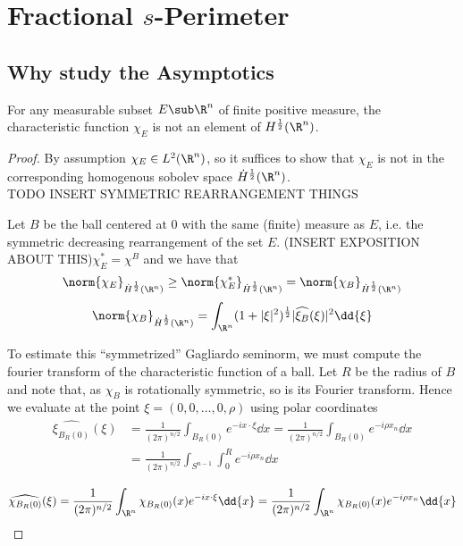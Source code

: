 \documentclass[../main.tex]{subfiles}
\begin{document}
\section{Fractional $s$-Perimeter}

\subsection{Why study the Asymptotics}

\begin{fact}
    For any measurable subset $ E\sub \R^{n} $ of finite positive measure, the characteristic function $ \chi_{E} $ is not an element of $ H^{\frac{1}{2}}(\R^{n}) $.
\end{fact}

\begin{proof}
    By assumption $ \chi_{E}\in L^{2}(\R^{n})$, so it suffices to show that $ \chi_{E} $ is not in the corresponding homogenous sobolev space $ \dot H^{\frac{1}{2}}(\R^{n}) $. \\  

    TODO INSERT SYMMETRIC REARRANGEMENT THINGS

    Let $ B $ be the ball centered at $ 0 $ with the same (finite) measure as $ E $, i.e. the symmetric decreasing rearrangement of the set $ E $. (INSERT EXPOSITION ABOUT THIS)$ \chi_{E}^{*} = \chi^{B} $ and we have that 
    \[
        \norm{\chi_{E}}_{\dot H^{\frac{1}{2}}(\R^{n})} \geq \norm{\chi_{E}^{*}}_{\dot H^{\frac{1}{2}}(\R^{n})} = \norm{\chi_{B}}_{\dot H^{\frac{1}{2}}(\R^{n})}
    \]
    \begin{align*}
        \norm{\chi_{B}}_{\dot H^{\frac{1}{2}}(\R^{n})} = \int_{\R^{n}} (1+| \xi|^{2})^{\frac{1}{2}}| \widehat{\xi_{B}}(\xi)|^{2} \dd{\xi}
    \end{align*}

    To estimate this ``symmetrized'' Gagliardo seminorm, we must compute the fourier transform of the characteristic function of a ball. Let $ R $ be the radius of $ B $ and note that, as $ \chi_{B} $ is rotationally symmetric, so is its Fourier transform. Hence we evaluate at the point $ \xi = (0,0,\ldots, 0, \rho) $ using polar coordinates
    \begin{align*}
        \widehat{\xi_{B_{R}(0)}}(\xi) &= \frac{1}{(2\pi)^{n/2}}\int_{B_{R}(0)} e^{-i x\cdot \xi} \dd{x} = \frac{1}{(2\pi)^{n/2}}\int_{B_{R}(0)} e^{-i \rho x_{n} } \dd{x} \\
        &=  \frac{1}{(2\pi)^{n/2}}\int_{S^{n-1}}\int_0^{R} e^{-i \rho x_{n} } \dd{x} 
    \end{align*}

    \begin{align*}
        \widehat{\chi_{B_{R}(0)}}(\xi) &= \frac{1}{(2\pi)^{n/2}}\int_{\R^{n}} \chi_{B_{R}(0)}(x) e^{-i x\cdot \xi} \dd{x} = \frac{1}{(2\pi)^{n/2}}\int_{\R^{n}} \chi_{B_{R}(0)}(x) e^{-i \rho x_{n}} \dd{x}  \\
    \end{align*}
\end{proof}
\end{document}
